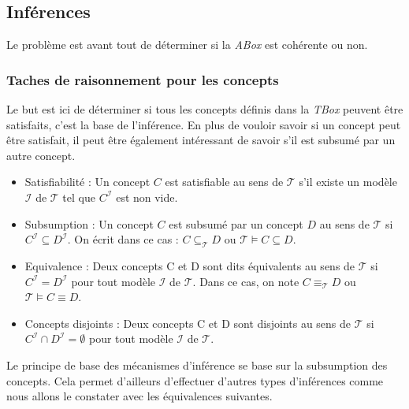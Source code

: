 \subsection{Inférences}
\label{sec:inferences}

\par Le problème est avant tout de déterminer si la \emph{ABox} est cohérente ou non.

\subsubsection{Taches de raisonnement pour les concepts}
\label{sec:tach-de-rais}

\par Le but est ici de déterminer si tous les concepts définis dans la \emph{TBox} peuvent être satisfaits, c'est la base de l'inférence. En plus de vouloir savoir si un concept peut être satisfait, il peut être également intéressant de savoir s'il est subsumé par un autre concept.

\begin{itemize}
\item Satisfiabilité : Un concept $C$ est satisfiable au sens de $\mathcal{T}$ s'il existe un modèle $\mathcal{I}$ de $\mathcal{T}$ tel que $C^\mathcal{I}$ est non vide.
\item Subsumption : Un concept $C$ est subsumé par un concept $D$ au sens de $\mathcal{T}$ si $C^\mathcal{I} \subseteq D^\mathcal{I}$. On écrit dans ce cas : $C \subseteq_\mathcal{T} D$ ou $\mathcal{T} \models C \subseteq D$.
\item Equivalence : Deux concepts C et D sont dits équivalents  au sens de $\mathcal{T}$ si $C^\mathcal{I} = D^\mathcal{I}$ pour tout modèle $\mathcal{I}$ de $\mathcal{T}$. Dans ce cas, on note $C \equiv_\mathcal{T} D$ ou $\mathcal{T} \models C \equiv D$.
\item Concepts disjoints : Deux concepts C et D sont disjoints au sens de $\mathcal{T}$ si $C^\mathcal{I} \cap D^\mathcal{I} = \emptyset$ pour tout modèle $\mathcal{I}$ de $\mathcal{T}$.
\end{itemize}

\par Le principe de base des mécanismes d'inférence se base sur la subsumption des concepts. Cela permet d'ailleurs d'effectuer d'autres types d'inférences comme nous allons le constater avec les équivalences suivantes.


